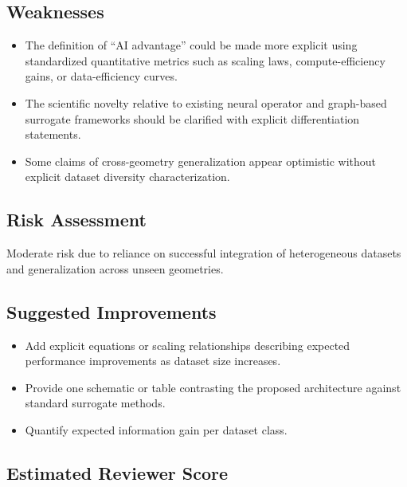 \documentclass[11pt]{article}
\begin{document}
\subsection*{Weaknesses}

\begin{itemize}[leftmargin=1.5em]

\item The definition of ``AI advantage'' could be made more explicit using standardized quantitative metrics such as scaling laws, compute-efficiency gains, or data-efficiency curves.

\item The scientific novelty relative to existing neural operator and graph-based surrogate frameworks should be clarified with explicit differentiation statements.

\item Some claims of cross-geometry generalization appear optimistic without explicit dataset diversity characterization.

\end{itemize}

\subsection*{Risk Assessment}

Moderate risk due to reliance on successful integration of heterogeneous datasets and generalization across unseen geometries.

\subsection*{Suggested Improvements}

\begin{itemize}[leftmargin=1.5em]

\item Add explicit equations or scaling relationships describing expected performance improvements as dataset size increases.

\item Provide one schematic or table contrasting the proposed architecture against standard surrogate methods.

\item Quantify expected information gain per dataset class.

\end{itemize}

\subsection*{Estimated Reviewer Score}
\end{document}
